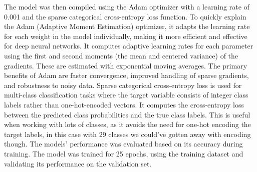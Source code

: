 \documentclass[12pt]{article}
\begin{document}
The model was then compiled using the Adam optimizer with a learning rate of 0.001 and the sparse categorical cross-entropy loss function.
To quickly explain the Adam (Adaptive Moment Estimation) optimizer, it adapts the learning rate for each weight in the model individually, making 
it more efficient and effective for deep neural networks. It computes adaptive learning rates for each parameter using the first and second moments (the mean and centered variance) of the gradients.
These are estimated with exponential moving averages. The primary benefits of Adam are faster convergence, improved handling of sparse gradients, and 
robustness to noisy data. Sparse categorical cross-entropy loss is used for multi-class classification tasks where the target variable consists of 
integer class labels rather than one-hot-encoded vectors. It computes the cross-entropy loss between the predicted class probabilities and the true class labels.
This is useful when working with lots of classes, as it avoids the need for one-hot encoding the target labels, in this case with 29 classes we could've gotten away with encoding though.
The models' performance was evaluated based on its accuracy during training. The model was trained for 25 epochs, using the training dataset and validating its performance on the validation set.
\end{document}
